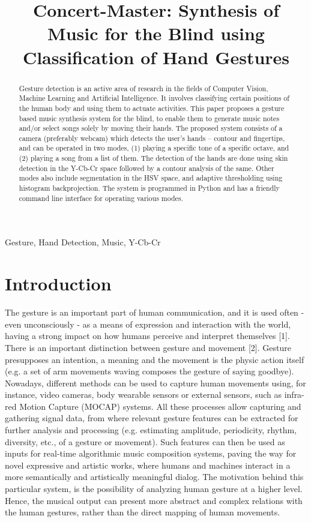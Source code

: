 \documentclass[letterpaper, 11 pt, twoside, conference]{ieeeconf}
\title{Concert-Master: Synthesis of Music for the Blind using Classification of Hand Gestures}
\begin{document}
%
\maketitle
%
\begin{abstract}

Gesture detection is an active area of research in the fields of Computer Vision,
Machine Learning and Artificial Intelligence. It involves classifying certain
positions of the human body and using them to actuate activities. This paper
proposes a gesture based music synthesis system for the blind, to enable them
to generate music notes and/or select songs solely by moving their hands. The
proposed system consists of a camera (preferably webcam) which detects the user's
hands -- contour and fingertips, and can be operated in two modes, (1) playing a
specific tone of a specific octave, and (2) playing a song from a list of them.
The detection of the hands are done using skin detection in the Y-Cb-Cr space
followed by a contour analysis of the same. Other modes also include segmentation
in the HSV space, and adaptive thresholding using histogram backprojection.
The system is programmed in Python and has a friendly command line
interface for operating various modes.
\end{abstract}
%
\begin{keywords}
Gesture, Hand Detection, Music, Y-Cb-Cr
\end{keywords}
%
\section{Introduction}
\label{sec:intro}

The gesture is an important part of human communication,
and it is used often - even unconsciously - as a means of expression and interaction with the world, having a strong impact on how humans perceive and interpret themselves [1]. There is an important distinction between gesture and movement [2]. Gesture presupposes an intention, a meaning and the movement is the physic action itself (e.g. a set of arm movements waving composes the gesture of saying goodbye). Nowadays, different methods can be used to capture human
movements using, for instance, video cameras, body wearable sensors or external sensors, such as infra-red Motion Capture (MOCAP) systems. All these processes allow capturing and gathering signal data, from where relevant gesture features can be extracted for further analysis and processing (e.g. estimating amplitude, periodicity, rhythm, diversity, etc., of a gesture or movement). Such features can then be used as inputs for real-time algorithmic music composition systems, paving the way for novel expressive and artistic works, where humans and machines interact in a more semantically and artistically meaningful dialog. The motivation behind this particular system, is the possibility of analyzing human gesture at a higher level. Hence, the musical output can present more abstract and complex relations with the human gestures, rather than the direct mapping of human movements.
\end{document}
